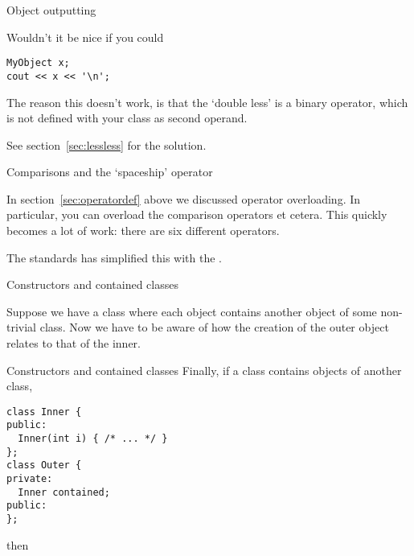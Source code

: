 
 {Object outputting}
\label{sec:cout-object}

Wouldn't it be nice if you could
\begin{lstlisting}
MyObject x;
cout << x << '\n';
\end{lstlisting}
The reason this doesn't work, is that the `double less'
is a binary operator, which is not defined
with your class as second operand.

See section~\ref{sec:lessless} for the solution.

 {Comparisons and the `spaceship' operator}

In section~\ref{sec:operatordef} above we discussed operator overloading.
In particular, you can overload the comparison operators \n{<,=,>} et cetera.
This quickly becomes a lot of work: there are six different operators.

The  standards has simplified this with
the .


 {Constructors and contained classes}

Suppose we have a class where each object contains
another object of some non-trivial class.
Now we have to be aware of how the creation of the
outer object relates to that of the inner.

\begin{block}{Constructors and contained classes}
  \label{sl:construct-contained1}
  Finally, if a class contains objects of another class,
  \lstset{style=snippetcode}
\begin{lstlisting}
class Inner {
public:
  Inner(int i) { /* ... */ }
};
class Outer {
private:
  Inner contained;
public:
};
\end{lstlisting}
\end{block}

then

